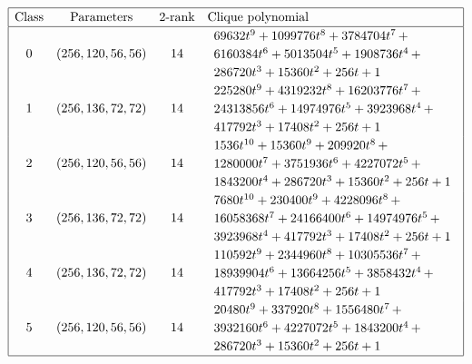 \begin{table}[!bhpt] %
%
\small{}
\begin{align*}
\def\arraystretch{1.2}
\begin{array}{|cccl|}
\hline
\text{Class} &
\text{Parameters} &
\text{2-rank} &
\text{Clique polynomial}
\\
\hline
0 &
(256, 120, 56, 56) &
14 &
\begin{array}{l}
69632t^{9} + 1099776t^{8} + 3784704t^{7}
\,+
\\
 6160384t^{6} + 5013504t^{5} + 1908736t^{4}
\,+
\\
 286720t^{3} + 15360t^{2} + 256t + 1
\end{array}
\\
1 &
(256, 136, 72, 72) &
14 &
\begin{array}{l}
225280t^{9} + 4319232t^{8} + 16203776t^{7}
\,+
\\
 24313856t^{6} + 14974976t^{5} + 3923968t^{4}
\,+
\\
 417792t^{3} + 17408t^{2} + 256t + 1
\end{array}
\\
2 &
(256, 120, 56, 56) &
14 &
\begin{array}{l}
1536t^{10} + 15360t^{9} + 209920t^{8}
\,+
\\
 1280000t^{7} + 3751936t^{6} + 4227072t^{5}
\,+
\\
 1843200t^{4} + 286720t^{3} + 15360t^{2} + 256t + 1
\end{array}
\\
3 &
(256, 136, 72, 72) &
14 &
\begin{array}{l}
7680t^{10} + 230400t^{9} + 4228096t^{8}
\,+
\\
 16058368t^{7} + 24166400t^{6} + 14974976t^{5}
\,+
\\
 3923968t^{4} + 417792t^{3} + 17408t^{2} + 256t + 1
\end{array}
\\
4 &
(256, 136, 72, 72) &
14 &
\begin{array}{l}
110592t^{9} + 2344960t^{8} + 10305536t^{7}
\,+
\\
 18939904t^{6} + 13664256t^{5} + 3858432t^{4}
\,+
\\
 417792t^{3} + 17408t^{2} + 256t + 1
\end{array}
\\
5 &
(256, 120, 56, 56) &
14 &
\begin{array}{l}
20480t^{9} + 337920t^{8} + 1556480t^{7}
\,+
\\
 3932160t^{6} + 4227072t^{5} + 1843200t^{4}
\,+
\\
 286720t^{3} + 15360t^{2} + 256t + 1
\end{array}
\\
\hline
\end{array}
\end{align*}
\caption{$[f_{8,4]}$ extended Cayley classes.}
\label{tab-c8_4_EC_classes}
\end{table}

